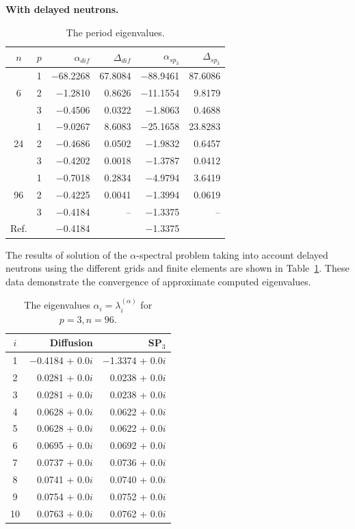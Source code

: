 \documentclass[authoryear]{elsarticle}
\begin{document}
\textbf{With delayed neutrons.}
\begin{table}[h]
\caption{The period eigenvalues.}
\label{tab:iaea_with_alpha_del}
\begin{center}
\begin{tabular}{c c r r r r}
\hline
$n$ & $p$ & $\alpha_{dif}$ & $\Delta_{dif}$ &$\alpha_{sp_3}$& $\Delta_{sp_3}$ \\
\hline
	& 1	&$-$68.2268 &67.8084& $-$88.9461 &87.6086\\
6	& 2	& $-$1.2810 & 0.8626& $-$11.1554 & 9.8179\\
	& 3	& $-$0.4506 & 0.0322&  $-$1.8063 & 0.4688\\ 
\hline
	& 1	& $-$9.0267  & 8.6083&$-$25.1658 &23.8283\\
24& 2	& $-$0.4686  & 0.0502& $-$1.9832 & 0.6457\\
	& 3	& $-$0.4202  & 0.0018& $-$1.3787 & 0.0412\\ 
\hline
	& 1	& $-$0.7018  & 0.2834& $-$4.9794 & 3.6419\\
96& 2	& $-$0.4225  & 0.0041& $-$1.3994 & 0.0619\\
	& 3	& $-$0.4184  &    -- & $-$1.3375 &    --\\ 
\hline
Ref.& & $-$0.4184 & & $-$1.3375 \\ 
\hline
\end{tabular}
\end{center}
\end{table}

The results of solution of the $\alpha$-spectral problem taking into account delayed neutrons using the different grids and finite elements are shown in Table~\ref{tab:iaea_with_alpha_del}.
These data demonstrate the convergence of approximate computed eigenvalues.

\begin{table}[h]
\caption{The eigenvalues $\alpha_i=\lambda_i^{(\alpha)}$ for $p=3, n=96$.}
\label{tab:iaea_with_alpha_del_10}
\begin{center}
\begin{tabular}{c r r}
\hline
$i$ & Diffusion & SP$_3$ \\
\hline
1& $-$0.4184 + 0.0$i$&$-$1.3374 + 0.0$i$\\
2& 0.0281 + 0.0$i$&0.0238 + 0.0$i$\\
3& 0.0281 + 0.0$i$&0.0238 + 0.0$i$\\
4& 0.0628 + 0.0$i$&0.0622 + 0.0$i$\\
5& 0.0628 + 0.0$i$&0.0622 + 0.0$i$\\
6& 0.0695 + 0.0$i$&0.0692 + 0.0$i$\\
7& 0.0737 + 0.0$i$&0.0736 + 0.0$i$\\
8& 0.0741 + 0.0$i$&0.0740 + 0.0$i$\\
9& 0.0754 + 0.0$i$&0.0752 + 0.0$i$\\
10& 0.0763 + 0.0$i$&0.0762 + 0.0$i$\\
\hline
\end{tabular}
\end{center}
\end{table}
\end{document}
